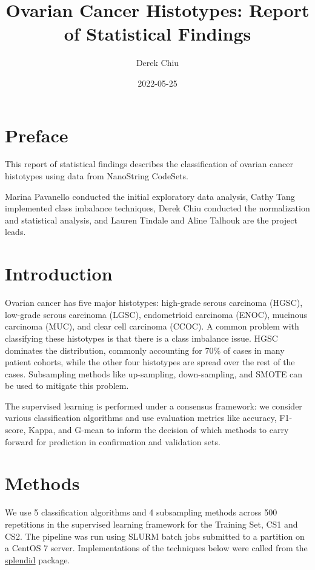 \documentclass[
]{report}
\title{Ovarian Cancer Histotypes: Report of Statistical Findings}
\author{Derek Chiu}
\date{2022-05-25}
\begin{document}
\maketitle

{
\hypersetup{linkcolor=}
\setcounter{tocdepth}{1}
\tableofcontents
}
\listoffigures
\listoftables
\hypertarget{preface}{%
\chapter*{Preface}\label{preface}}

This report of statistical findings describes the classification of ovarian cancer histotypes using data from NanoString CodeSets.

Marina Pavanello conducted the initial exploratory data analysis, Cathy Tang implemented class imbalance techniques, Derek Chiu conducted the normalization and statistical analysis, and Lauren Tindale and Aline Talhouk are the project leads.

\hypertarget{introduction}{%
\chapter{Introduction}\label{introduction}}

Ovarian cancer has five major histotypes: high-grade serous carcinoma (HGSC), low-grade serous carcinoma (LGSC), endometrioid carcinoma (ENOC), mucinous carcinoma (MUC), and clear cell carcinoma (CCOC). A common problem with classifying these histotypes is that there is a class imbalance issue. HGSC dominates the distribution, commonly accounting for 70\% of cases in many patient cohorts, while the other four histotypes are spread over the rest of the cases. Subsampling methods like up-sampling, down-sampling, and SMOTE can be used to mitigate this problem.

The supervised learning is performed under a consensus framework: we consider various classification algorithms and use evaluation metrics like accuracy, F1-score, Kappa, and G-mean to inform the decision of which methods to carry forward for prediction in confirmation and validation sets.

\hypertarget{methods}{%
\chapter{Methods}\label{methods}}

We use 5 classification algorithms and 4 subsampling methods across 500 repetitions in the supervised learning framework for the Training Set, CS1 and CS2. The pipeline was run using SLURM batch jobs submitted to a partition on a CentOS 7 server. Implementations of the techniques below were called from the \href{https://alinetalhouk.github.io/splendid/}{splendid} package.
\end{document}
